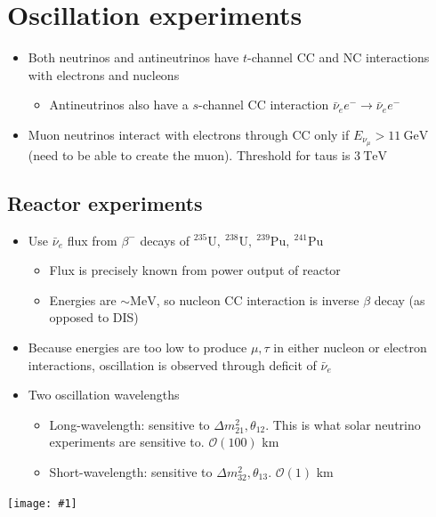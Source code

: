 \documentclass[11pt]{article}
\newcommand{\nubar}{{\bar{\nu}}}
\newcommand{\gev}{\text{GeV}}
\newcommand{\mev}{\text{MeV}}
\newcommand{\tev}{\text{TeV}}
\newcommand{\el}{\ensuremath{e^{-}}}
\newcommand{\ord}[1]{\ensuremath{\mathcal{O}(#1)}}
\newcommand{\embedimgw}[2]{\begin{center}\texttt{[image: \#1]}\end{center}}
\begin{document}
\section{Oscillation experiments}
\begin{itemize}
  \item Both neutrinos and antineutrinos have $t$-channel CC and NC interactions with electrons and nucleons
  \begin{itemize}
    \item Antineutrinos also have a $s$-channel CC interaction $\nubar_e \el \rightarrow \nubar_e \el$
  \end{itemize}
  \item Muon neutrinos interact with electrons through CC only if $E_{\nu_\mu}>11~\gev$ (need to be able to create the muon). Threshold for taus is $3~\tev$
\end{itemize}

\subsection{Reactor experiments}
\begin{itemize}
  \item Use $\nubar_e$ flux from $\beta^-$ decays of $^{235}\text{U},~^{238}\text{U},~^{239}\text{Pu},~^{241}\text{Pu}$
  \begin{itemize}
    \item Flux is precisely known from power output of reactor
    \item Energies are $\sim\mev$, so nucleon CC interaction is inverse $\beta$ decay (as opposed to DIS)
  \end{itemize}
  \item Because energies are too low to produce $\mu,\tau$ in either nucleon or electron interactions, oscillation is observed through deficit of $\nubar_e$
  \item Two oscillation wavelengths
  \begin{itemize}
    \item Long-wavelength: sensitive to $\Delta m_{21}^2,\theta_{12}$. This is what solar neutrino experiments are sensitive to. $\ord{100}$ km
    \item Short-wavelength: sensitive to $\Delta m_{32}^2,\theta_{13}$. $\ord1$ km
  \end{itemize}
\end{itemize}
\embedimgw{figs/nue_probability.png}{.5}
\end{document}
